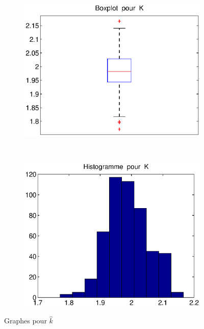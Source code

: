 \begin{figure}[!ht]
        \centering
        \begin{subfigure}[b]{0.5\textwidth}
                \includegraphics[width=\textwidth]{graphes/boxplot_kmg.eps}
        \end{subfigure}%
        ~
        \begin{subfigure}[b]{0.5\textwidth}
                \includegraphics[width=\textwidth]{graphes/hist_kmg.eps}
        \end{subfigure}
        \caption{Graphes pour $\hat{k}$}\label{fig:kmg}
\end{figure}

